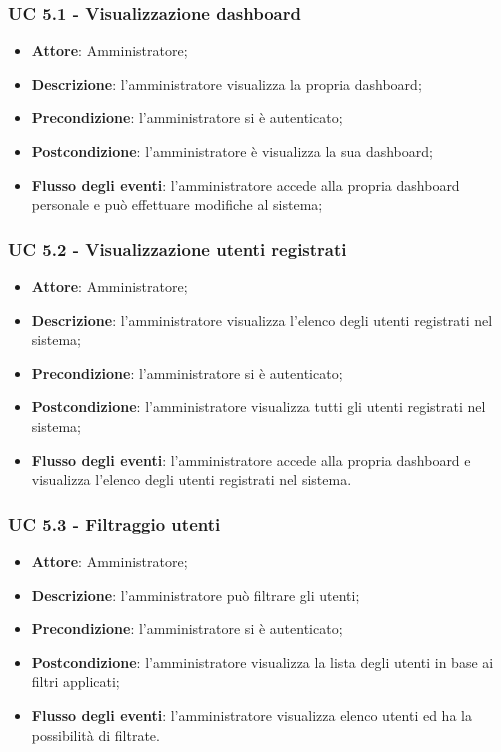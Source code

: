 \subsubsection{UC 5.1 - Visualizzazione dashboard}

\begin{itemize}
\item \textbf{Attore}: Amministratore; 
\item \textbf{Descrizione}: l'amministratore visualizza la propria dashboard;
\item \textbf{Precondizione}: l'amministratore si è autenticato;
\item \textbf{Postcondizione}: l'amministratore è visualizza la sua dashboard;
\item \textbf{Flusso degli eventi}: l'amministratore accede alla propria dashboard personale e può effettuare modifiche al sistema;
\end{itemize}

\subsubsection{UC 5.2 - Visualizzazione utenti registrati}

\begin{itemize}
\item \textbf{Attore}: Amministratore;
\item \textbf{Descrizione}: l'amministratore visualizza l'elenco degli utenti registrati nel sistema;
\item \textbf{Precondizione}: l'amministratore si è autenticato;
\item \textbf{Postcondizione}: l'amministratore visualizza tutti gli utenti registrati nel sistema;
\item \textbf{Flusso degli eventi}: l'amministratore accede alla propria dashboard e visualizza l'elenco degli utenti registrati nel sistema.
\end{itemize}

\subsubsection{UC 5.3 - Filtraggio utenti}
\begin{itemize}
\item \textbf{Attore}: Amministratore;
\item \textbf{Descrizione}: l'amministratore può filtrare gli utenti;
\item \textbf{Precondizione}: l'amministratore si è autenticato;
\item \textbf{Postcondizione}: l'amministratore visualizza la lista degli utenti in base ai filtri applicati;
\item \textbf{Flusso degli eventi}: l'amministratore visualizza elenco utenti ed ha la possibilità di filtrate.
\end{itemize}
